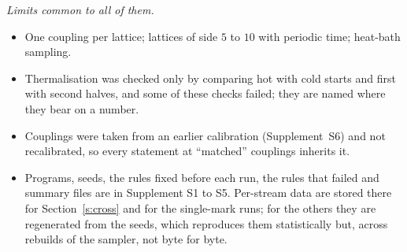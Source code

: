 \emph{Limits common to all of them.}
\begin{itemize}
\item One coupling per lattice; lattices of side $5$ to $10$ with periodic time; heat-bath sampling.
\item Thermalisation was checked only by comparing hot with cold starts and first with second halves, and
some of these checks failed; they are named where they bear on a number.
\item Couplings were taken from an earlier calibration (Supplement~S6) and not recalibrated, so every statement at
``matched'' couplings inherits it.
\item Programs, seeds, the rules fixed before each run, the rules that failed and summary files are
in Supplement S1 to S5. Per-stream data are stored there for Section~\ref{s:cross} and for the single-mark runs; for
the others they are regenerated from the seeds, which reproduces them statistically but, across rebuilds of
the sampler, not byte for byte.
\end{itemize}


